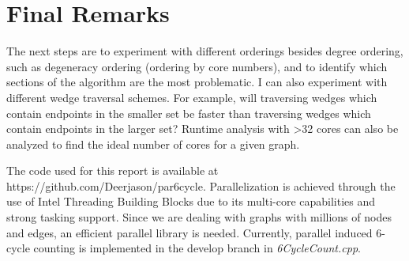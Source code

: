 \documentclass[11pt]{article}
\begin{document}
\section {Final Remarks}

The next steps are to experiment with different orderings besides degree ordering, such as degeneracy ordering (ordering by core numbers), and to identify which sections of the algorithm are the most problematic.
I can also experiment with different wedge traversal schemes.
For example, will traversing wedges which contain endpoints in the smaller set be faster than traversing wedges which contain endpoints in the larger set?
Runtime analysis with >32 cores can also be analyzed to find the ideal number of cores for a given graph.

The code used for this report is available at https://github.com/Deerjason/par6cycle.
Parallelization is achieved through the use of Intel Threading Building Blocks due to its multi-core capabilities and strong tasking support.
Since we are dealing with graphs with millions of nodes and edges, an efficient parallel library is needed.
Currently, parallel induced 6-cycle counting is implemented in the develop branch in \textit{6CycleCount.cpp}.

{}

\end{document}
